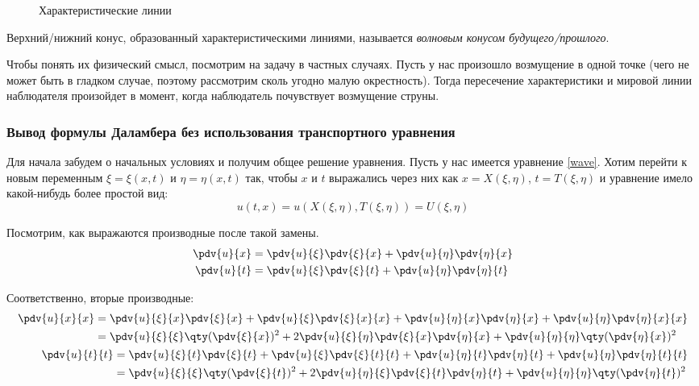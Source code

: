 \begin{figure}[ht]
  \centering
  \caption{Характеристические линии}
\end{figure}

Верхний/нижний конус, образованный характеристическими линиями, называется \emph{волновым конусом будущего/прошлого}.

Чтобы понять их физический смысл, посмотрим на задачу в частных случаях. Пусть у нас произошло возмущение в одной точке (чего не может быть в гладком случае, поэтому рассмотрим сколь угодно малую окрестность). Тогда пересечение характеристики и мировой линии наблюдателя произойдет в момент, когда наблюдатель почувствует возмущение струны.

\subsubsection{Вывод формулы Даламбера без использования транспортного уравнения}

Для начала забудем о начальных условиях и получим общее решение уравнения. Пусть у нас имеется уравнение \eqref{wave}. Хотим перейти к новым переменным $\xi = \xi(x, t)$ и $\eta = \eta(x, t)$ так, чтобы $x$ и $t$ выражались через них как $x = X(\xi, \eta)$, $t = T(\xi, \eta)$ и уравнение имело какой-нибудь более простой вид:
\begin{equation}
  u(t, x) = u(X(\xi, \eta), T(\xi, \eta)) = U(\xi, \eta)
\end{equation}

Посмотрим, как выражаются производные после такой замены.
\begin{equation}
  \begin{aligned}
    \pdv{u}{x} &= \pdv{u}{\xi} \pdv{\xi}{x} + \pdv{u}{\eta} \pdv{\eta}{x} \\
    \pdv{u}{t} &= \pdv{u}{\xi} \pdv{\xi}{t} + \pdv{u}{\eta} \pdv{\eta}{t}
  \end{aligned}
\end{equation}

Соответственно, вторые производные:
\begin{align}
  \begin{aligned}
    \pdv{u}{x}{x}
    &= \pdv{u}{\xi}{x} \pdv{\xi}{x} + \pdv{u}{\xi} \pdv{\xi}{x}{x} + \pdv{u}{\eta}{x} \pdv{\eta}{x} + \pdv{u}{\eta} \pdv{\eta}{x}{x} \\
    &= \pdv{u}{\xi}{\xi} \qty(\pdv{\xi}{x})^2 + 2 \pdv{u}{\xi}{\eta} \pdv{\xi}{x} \pdv{\eta}{x} + \pdv{u}{\eta}{\eta} \qty(\pdv{\eta}{x})^2
  \end{aligned} \\
  \begin{aligned}
    \pdv{u}{t}{t}
    &= \pdv{u}{\xi}{t} \pdv{\xi}{t} + \pdv{u}{\xi} \pdv{\xi}{t}{t} + \pdv{u}{\eta}{t} \pdv{\eta}{t} + \pdv{u}{\eta} \pdv{\eta}{t}{t} \\
    &= \pdv{u}{\xi}{\xi} \qty(\pdv{\xi}{t})^2 + 2 \pdv{u}{\eta}{\xi} \pdv{\xi}{t} \pdv{\eta}{t} + \pdv{u}{\eta}{\eta} \qty(\pdv{\eta}{t})^2
  \end{aligned}
\end{align}

